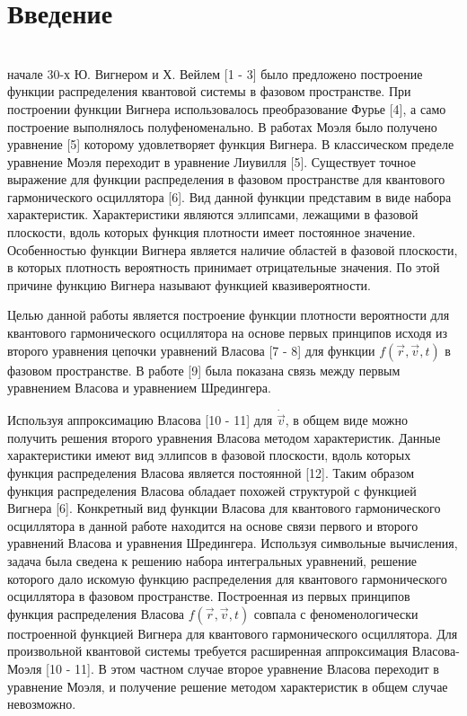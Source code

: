 \documentclass[a4paper,14pt]{article}
\begin{document}
\tableofcontents
\newpage
\section{Введение}
~\\
 начале 30-х Ю. Вигнером и Х. Вейлем [1 - 3] было предложено построение функции распределения квантовой системы в фазовом пространстве. При построении функции Вигнера использовалось преобразование Фурье [4], а само построение выполнялось полуфеноменально. В работах Моэля было получено уравнение [5] которому удовлетворяет функция Вигнера. В классическом пределе уравнение Моэля переходит в уравнение Лиувилля [5]. Существует точное выражение для функции распределения в фазовом пространстве для квантового гармонического осциллятора [6]. Вид данной функции представим в виде набора характеристик. Характеристики являются эллипсами, лежащими в фазовой плоскости, вдоль которых функция плотности имеет постоянное значение. Особенностью функции Вигнера является наличие областей в фазовой плоскости, в которых плотность вероятность принимает отрицательные значения. По этой причине функцию Вигнера называют функцией квазивероятности.

Целью данной работы является построение функции плотности вероятности для квантового гармонического осциллятора на основе первых принципов исходя из второго уравнения цепочки уравнений Власова [7 - 8] для функции $f(\vec r, \vec v, t)$ в фазовом пространстве. В работе [9] была показана связь между первым уравнением Власова и уравнением Шредингера.

Используя аппроксимацию Власова [10 - 11] для $\dot {\vec v}$, в общем виде можно получить решения второго уравнения Власова методом характеристик. Данные характеристики имеют вид эллипсов в фазовой плоскости, вдоль которых функция распределения Власова является постоянной [12]. Таким образом функция распределения Власова обладает похожей структурой с функцией Вигнера [6]. Конкретный вид функции Власова для квантового гармонического осциллятора в данной работе находится на основе связи первого и второго уравнений Власова и уравнения Шредингера. Используя символьные вычисления, задача была сведена к решению набора интегральных уравнений, решение которого дало искомую функцию распределения для квантового гармонического осциллятора в фазовом пространстве. Построенная из первых принципов функция распределения Власова $f(\vec r, \vec v, t)$ совпала с феноменологически построенной функцией Вигнера для квантового гармонического осциллятора. Для произвольной квантовой системы требуется расширенная аппроксимация Власова-Моэля [10 - 11]. В этом частном случае второе уравнение Власова переходит в уравнение Моэля, и получение решение методом характеристик в общем случае невозможно.
\end{document}
